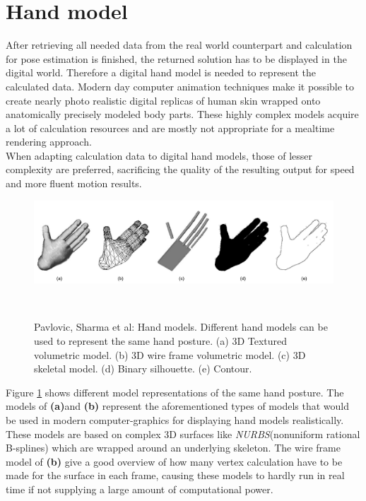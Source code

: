 \section{Hand model}
After retrieving all needed data from the real world counterpart and calculation for pose estimation is finished, the returned solution has to be displayed in the digital world. Therefore a digital hand model is needed to represent the calculated data. Modern day computer animation techniques make it possible to create nearly photo realistic digital replicas of human skin wrapped onto anatomically precisely modeled body parts. These highly complex models acquire a lot of calculation resources and are mostly not appropriate for a mealtime rendering approach.\\
When adapting calculation data to digital hand models, those of lesser complexity are preferred, sacrificing the quality of the resulting output for speed and more fluent motion results.
\begin{figure}[H]
\includegraphics[width=\textwidth]{images/Pavlovic-Sharmaetal.jpg}
\caption{Pavlovic, Sharma et al: Hand models. Different hand models can be used to represent the same hand posture. (a) 3D Textured volumetric model. (b) 3D wire frame volumetric model. (c) 3D skeletal model. (d) Binary silhouette. (e) Contour.}
~\cite[p.~682]{Pavlovic.1997}
\label{handmodels_detail_level}
\end{figure}
Figure \ref{handmodels_detail_level} shows different model representations of the same hand posture. The models of \textbf{(a)}and \textbf{(b)} represent the aforementioned types of models that would be used in modern computer-graphics for displaying hand models realistically.\\These models are based on complex 3D surfaces like \textit{NURBS}(nonuniform rational B-splines) which are wrapped around an underlying skeleton. The wire frame model of \textbf{(b)} give a good overview of how many vertex calculation have to be made for the surface in each frame, causing these models to hardly run in real time if not supplying a large amount of computational power.\\
